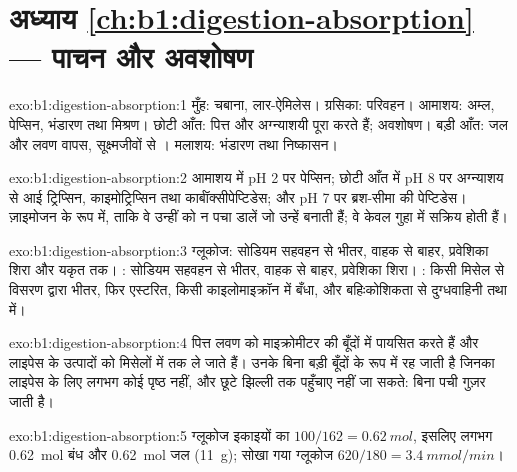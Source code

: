 \section*{अध्याय \ref{ch:b1:digestion-absorption} --- पाचन और अवशोषण}

\begin{solution}{exo:b1:digestion-absorption:1}
मुँह: चबाना, लार-ऐमिलेस। ग्रसिका: परिवहन। आमाशय:
अम्ल, पेप्सिन, भंडारण तथा मिश्रण। छोटी आँत: पित्त और अग्न्याशयी
  पूरा करते हैं; अवशोषण। बड़ी आँत: जल और
लवण वापस, सूक्ष्मजीवों से । मलाशय: भंडारण तथा
निष्कासन।
\end{solution}

\begin{solution}{exo:b1:digestion-absorption:2}
आमाशय में pH 2 पर पेप्सिन; छोटी आँत में pH 8 पर अग्न्याशय से आई
ट्रिप्सिन, काइमोट्रिप्सिन तथा कार्बॉक्सीपेप्टिडेस;
और pH 7 पर ब्रश-सीमा की पेप्टिडेस। ज़ाइमोजन के रूप में, ताकि वे उन्हीं
 को न पचा डालें जो उन्हें बनाती हैं; वे केवल गुहा में सक्रिय होती हैं।
\end{solution}

\begin{solution}{exo:b1:digestion-absorption:3}
ग्लूकोज: सोडियम सहवहन से भीतर, वाहक से बाहर, प्रवेशिका शिरा और
यकृत तक। : सोडियम सहवहन से भीतर, वाहक से बाहर, प्रवेशिका शिरा।
: किसी मिसेल से विसरण द्वारा भीतर, फिर एस्टरित, किसी
काइलोमाइक्रॉन में बँधा, और बहिःकोशिकता से दुग्धवाहिनी तथा  में।
\end{solution}

\begin{solution}{exo:b1:digestion-absorption:4}
पित्त लवण  को माइक्रोमीटर की बूँदों में पायसित करते हैं और लाइपेस के
उत्पादों को मिसेलों में  तक ले जाते हैं। उनके बिना
 बड़ी बूँदों के रूप में रह जाती है जिनका लाइपेस के लिए लगभग कोई पृष्ठ
नहीं, और छूटे  झिल्ली तक पहुँचाए नहीं जा सकते:  बिना पची
गुज़र जाती है।
\end{solution}

\begin{solution}{exo:b1:digestion-absorption:5}
ग्लूकोज इकाइयों का $100/162 = \qty{0.62}{mol}$, इसलिए लगभग
\qty{0.62}{mol} बंध और \qty{0.62}{mol} जल (\qty{11}{g});
सोखा गया ग्लूकोज $620/180 = \qty{3.4}{mmol/min}$।
\end{solution}

